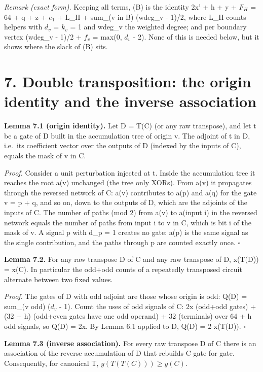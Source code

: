 \emph{Remark (exact form).} Keeping all terms, (B) is the identity 2x' + h + y + \(F_H\) = 64 + q + z + \(e_1\) + L\_H + sum\_(v in B) (wdeg\_v - 1)/2, where L\_H counts helpers with \(d_v\) = \(k_v\) = 1 and wdeg\_v the weighted degree; and per boundary vertex (wdeg\_v - 1)/2 + \(f_v\) = max(0, \(d_v\) - 2). None of this is needed below, but it shows where the slack of (B) sits.

\hypertarget{double-transposition-the-origin-identity-and-the-inverse-association}{%
\section{7. Double transposition: the origin identity and the inverse association}\label{double-transposition-the-origin-identity-and-the-inverse-association}}

\textbf{Lemma 7.1 (origin identity).} Let D = T(C) (or any raw transpose), and let t be a gate of D built in the accumulation tree of origin v. The adjoint of t in D, i.e.~its coefficient vector over the outputs of D (indexed by the inputs of C), equals the mask of v in C.

\emph{Proof.} Consider a unit perturbation injected at t. Inside the accumulation tree it reaches the root a(v) unchanged (the tree only XORs). From a(v) it propagates through the reversed network of C: a(v) contributes to a(p) and a(q) for the gate v = p + q, and so on, down to the outputs of D, which are the adjoints of the inputs of C. The number of paths (mod 2) from a(v) to a(input i) in the reversed network equals the number of paths from input i to v in C, which is bit i of the mask of v. A signal p with d\_p = 1 creates no gate: a(p) is the same signal as the single contribution, and the paths through p are counted exactly once. \(\square\)

\textbf{Lemma 7.2.} For any raw transpose D of C and any raw transpose of D, x(T(D)) = x(C). In particular the odd+odd counts of a repeatedly transposed circuit alternate between two fixed values.

\emph{Proof.} The gates of D with odd adjoint are those whose origin is odd: Q(D) = sum\_(v odd) (\(d_v\) - 1). Count the uses of odd signals of C: 2x (odd+odd gates) + (32 + h) (odd+even gates have one odd operand) + 32 (terminals) over 64 + h odd signals, so Q(D) = 2x. By Lemma 6.1 applied to D, Q(D) = 2 x(T(D)). \(\square\)

\textbf{Lemma 7.3 (inverse association).} For every raw transpose D of C there is an association of the reverse accumulation of D that rebuilds C gate for gate. Consequently, for canonical T, \(y(T(T(C)))\ge y(C)\).

